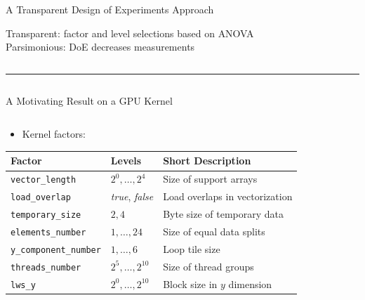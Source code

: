 \documentclass[11pt, compress, aspectratio=169, xcolor={table,usenames,dvipsnames}]{beamer}
\begin{document}
\begin{frame}
\begin{columns}
\begin{column}{0.89\columnwidth}
\begin{columns}
\begin{column}[t]{0.48\columnwidth}
\begin{block}{A Transparent Design of Experiments Approach}
\begin{center}
  {\normalsize
    \colorbox{WinterSkin}{\alert{\vphantom{g}Transparent}: {\small \alert{factor} and \alert{level} selections based on \alert{ANOVA}}} \\[0.2em]
    \colorbox{WinterSkin}{\alert{Parsimonious}: {\small DoE \alert{decreases measurements}}}
  }
\end{center}
\end{block}
\end{column}
\end{columns}
\vspace{0.2em}
\rule{\columnwidth}{0.4ex}
\vspace{-2.5em}
\begin{columns}
\begin{column}[t]{0.48\columnwidth}
\begin{block}{A Motivating Result on a GPU Kernel}
\begin{columns}
\begin{column}{0.49\columnwidth}
\begin{itemize}
\item Kernel \alert{factors}:
\end{itemize}
\vspace{0.6em}
\begin{table}[htbp]
\centering
\tiny
\begin{tabular}{llp{}}
\toprule
Factor & Levels & Short Description\\
\midrule
\texttt{vector\_length} & \(2^0,\dots,2^4\) & Size of support arrays\\
\texttt{load\_overlap} & \textit{true}, \textit{false} & Load overlaps in vectorization\\
\texttt{temporary\_size} & \(2,4\) & Byte size of temporary data\\
\texttt{elements\_number} & \(1,\dots,24\) & Size of equal data splits\\
\texttt{y\_component\_number} & \(1,\dots,6\) & Loop tile size\\
\texttt{threads\_number} & \(2^5,\dots,2^{10}\) & Size of thread groups\\
\texttt{lws\_y} & \(2^0,\dots,2^{10}\) & Block size in \(y\) dimension\\
\bottomrule
\end{tabular}
\end{table}
\end{column}


\end{columns}
\end{block}
\end{column}
\end{columns}
\end{column}
\end{columns}
\end{frame}
\end{document}
